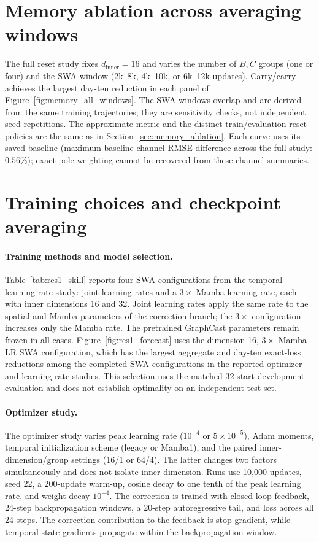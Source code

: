 \documentclass{article}
\begin{document}
\section{Memory ablation across averaging windows}
\label{app:memory_windows}
The full reset study fixes $d_{\mathrm{inner}}=16$ and varies the number of $B,C$ groups (one or four) and the SWA window (2k--8k, 4k--10k, or 6k--12k updates). Carry/carry achieves the largest day-ten reduction in each panel of Figure~\ref{fig:memory_all_windows}. The SWA windows overlap and are derived from the same training trajectories; they are sensitivity checks, not independent seed repetitions. The approximate metric and the distinct train/evaluation reset policies are the same as in Section~\ref{sec:memory_ablation}. Each curve uses its saved baseline (maximum baseline channel-RMSE difference across the full study: $0.56\%$); exact pole weighting cannot be recovered from these channel summaries.

\section{Training choices and checkpoint averaging}
\label{app:training}
\paragraph{Training methods and model selection.}
Table~\ref{tab:res1_skill} reports four SWA configurations from the temporal learning-rate study: joint learning rates and a $3\times$ Mamba learning rate, each with inner dimensions 16 and 32. Joint learning rates apply the same rate to the spatial and Mamba parameters of the correction branch; the $3\times$ configuration increases only the Mamba rate. The pretrained GraphCast parameters remain frozen in all cases. Figure~\ref{fig:res1_forecast} uses the dimension-16, $3\times$ Mamba-LR SWA configuration, which has the largest aggregate and day-ten exact-loss reductions among the completed SWA configurations in the reported optimizer and learning-rate studies. This selection uses the matched 32-start development evaluation and does not establish optimality on an independent test set.

\paragraph{Optimizer study.}
The optimizer study varies peak learning rate ($10^{-4}$ or $5\times10^{-5}$), Adam moments, temporal initialization scheme (legacy or Mamba1), and the paired inner-dimension/group settings (16/1 or 64/4). The latter changes two factors simultaneously and does not isolate inner dimension. Runs use 10,000 updates, seed 22, a 200-update warm-up, cosine decay to one tenth of the peak learning rate, and weight decay $10^{-4}$. The correction is trained with closed-loop feedback, 24-step backpropagation windows, a 20-step autoregressive tail, and loss across all 24 steps. The correction contribution to the feedback is stop-gradient, while temporal-state gradients propagate within the backpropagation window.
\end{document}
